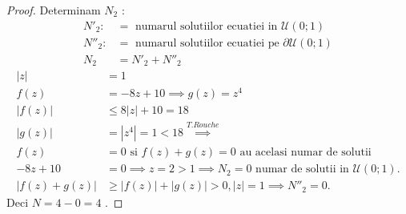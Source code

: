 \begin{aplicatie}
\begin{proof}
        Determinam $N_2$ :
        \begin{align*}
            N'_2 :&= \text{ numarul solutiilor ecuatiei in } \mathcal{U}(0;1) \\
            N''_2 :&= \text{ numarul solutiilor ecuatiei pe } \partial \mathcal{U}(0;1) \\
            N_2 &= N'_2 + N''_2
        \end{align*}
        \begin{align*}
            |z| & = 1 \\
            f(z) & = -8z + 10 \implies g(z) = z^4 \\
            |f(z)| &\leq 8|z| + 10 =  18 \\
            |g(z)| &= |z^4| = 1 < 18 \overset{T.Rouche}{\implies}\\
            f(z) &= 0 \text{ si } f(z) + g(z) = 0 \text{ au acelasi numar de solutii }\\
            -8z + 10 &= 0 \implies z = 2 > 1 \implies N_2 = 0 \text{ numar de solutii in } \mathcal{U}(0;1) .\\
            |f(z) + g(z)| &\geq |f(z)| + |g(z)| > 0, |z| = 1 \implies N''_2 = 0 .
        \end{align*}
        Deci $N = 4-0 = 4$ .
    \end{proof}
\end{aplicatie}

